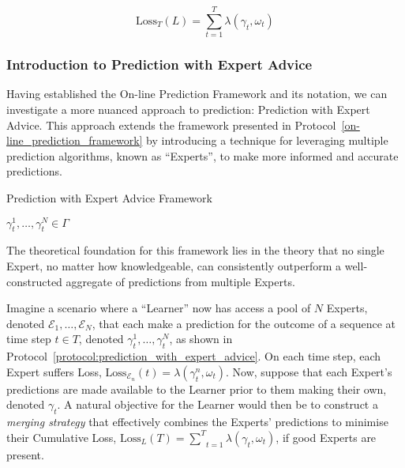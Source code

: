 \begin{equation}\label{algorithm:loss_function}
    \text{Loss}_T(L) = \underset{t=1}{\overset{T}{\sum}} \lambda(\gamma_t, \omega_t)
\end{equation}

\subsubsection{Introduction to Prediction with Expert Advice}\label{subsubsection:introduction_to_predicion_with_expert_advice}
Having established the On-line Prediction Framework and its notation, we can investigate a more nuanced approach to prediction: Prediction with Expert Advice. This approach extends the framework presented in Protocol~\ref{on-line_prediction_framework} by introducing a technique for leveraging multiple prediction algorithms, known as ``Experts'', to make more informed and accurate predictions.

\begin{protocol}[H]
    \caption{Prediction with Expert Advice Framework}\label{protocol:prediction_with_expert_advice}
    \begin{algorithmic}[1]
        $\gamma^1_t, \ldots, \gamma^N_t \in \Gamma$
    \end{algorithmic}
\end{protocol}

The theoretical foundation for this framework lies in the theory that no single Expert, no matter how knowledgeable, can consistently outperform a well-constructed aggregate of predictions from multiple Experts.

Imagine a scenario where a ``Learner'' now has access a pool of $N$ Experts, denoted $\mathcal{E}_1, \ldots, \mathcal{E}_N$, that each make a prediction for the outcome of a sequence at time step $t \in T$, denoted $\gamma^1_t, \ldots, \gamma^N_t$, as shown in Protocol~\ref{protocol:prediction_with_expert_advice}. On each time step, each Expert suffers Loss, $\text{Loss}_{\mathcal{E}_n}(t) = \lambda(\gamma^n_t, \omega_t)$. Now, suppose that each Expert's predictions are made available to the Learner prior to them making their own, denoted $\gamma_t$. A natural objective for the Learner would then be to construct a \textit{merging strategy} that effectively combines the Experts' predictions to minimise their Cumulative Loss, $\text{Loss}_L(T) = \underset{t=1}{\overset{T}{\sum}}\lambda(\gamma_t, \omega_t)$, if good Experts are present.

